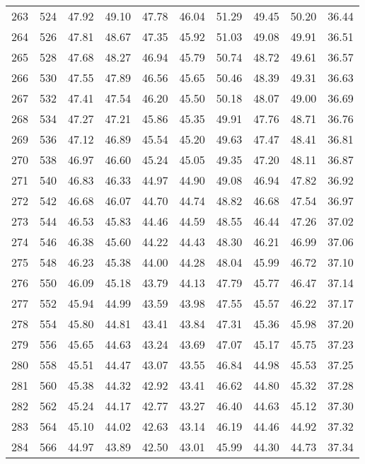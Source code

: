 \begin{longtable}{rrllllllll}
		263 & 524 & 47.92 & 49.10 & 47.78 & 46.04 & 51.29 & 49.45 & 50.20 & 36.44 \\ 
		264 & 526 & 47.81 & 48.67 & 47.35 & 45.92 & 51.03 & 49.08 & 49.91 & 36.51 \\ 
		265 & 528 & 47.68 & 48.27 & 46.94 & 45.79 & 50.74 & 48.72 & 49.61 & 36.57 \\ 
		266 & 530 & 47.55 & 47.89 & 46.56 & 45.65 & 50.46 & 48.39 & 49.31 & 36.63 \\ 
		267 & 532 & 47.41 & 47.54 & 46.20 & 45.50 & 50.18 & 48.07 & 49.00 & 36.69 \\ 
		268 & 534 & 47.27 & 47.21 & 45.86 & 45.35 & 49.91 & 47.76 & 48.71 & 36.76 \\ 
		269 & 536 & 47.12 & 46.89 & 45.54 & 45.20 & 49.63 & 47.47 & 48.41 & 36.81 \\ 
		270 & 538 & 46.97 & 46.60 & 45.24 & 45.05 & 49.35 & 47.20 & 48.11 & 36.87 \\ 
		271 & 540 & 46.83 & 46.33 & 44.97 & 44.90 & 49.08 & 46.94 & 47.82 & 36.92 \\ 
		272 & 542 & 46.68 & 46.07 & 44.70 & 44.74 & 48.82 & 46.68 & 47.54 & 36.97 \\ 
		273 & 544 & 46.53 & 45.83 & 44.46 & 44.59 & 48.55 & 46.44 & 47.26 & 37.02 \\ 
		274 & 546 & 46.38 & 45.60 & 44.22 & 44.43 & 48.30 & 46.21 & 46.99 & 37.06 \\ 
		275 & 548 & 46.23 & 45.38 & 44.00 & 44.28 & 48.04 & 45.99 & 46.72 & 37.10 \\ 
		276 & 550 & 46.09 & 45.18 & 43.79 & 44.13 & 47.79 & 45.77 & 46.47 & 37.14 \\ 
		277 & 552 & 45.94 & 44.99 & 43.59 & 43.98 & 47.55 & 45.57 & 46.22 & 37.17 \\ 
		278 & 554 & 45.80 & 44.81 & 43.41 & 43.84 & 47.31 & 45.36 & 45.98 & 37.20 \\ 
		279 & 556 & 45.65 & 44.63 & 43.24 & 43.69 & 47.07 & 45.17 & 45.75 & 37.23 \\ 
		280 & 558 & 45.51 & 44.47 & 43.07 & 43.55 & 46.84 & 44.98 & 45.53 & 37.25 \\ 
		281 & 560 & 45.38 & 44.32 & 42.92 & 43.41 & 46.62 & 44.80 & 45.32 & 37.28 \\ 
		282 & 562 & 45.24 & 44.17 & 42.77 & 43.27 & 46.40 & 44.63 & 45.12 & 37.30 \\ 
		283 & 564 & 45.10 & 44.02 & 42.63 & 43.14 & 46.19 & 44.46 & 44.92 & 37.32 \\ 
		284 & 566 & 44.97 & 43.89 & 42.50 & 43.01 & 45.99 & 44.30 & 44.73 & 37.34 \\ 

\end{longtable}

